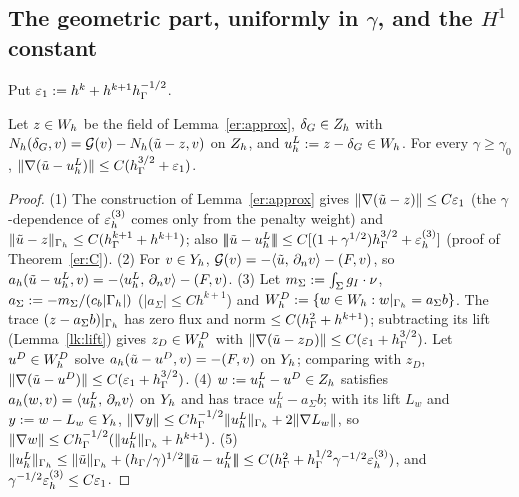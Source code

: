 \subsection{The geometric part, uniformly in \texorpdfstring{$\gamma$}{gamma}, and the \texorpdfstring{$H^1$}{H1} constant}
Put $\varepsilon_1:=h^k+h^{k+1}h_\Gamma^{-1/2}$.
\begin{lemma}\label{lk:lin}
Let $z\in W_h$ be the field of Lemma~\ref{er:approx}, $\delta_G\in Z_h$ with $N_h(\delta_G,v)=\mathcal G(v)-N_h(\tilde u-z,v)$ on $Z_h$, and $u^L_h:=z-\delta_G\in W_h$. For every $\gamma\ge\gamma_0$, $\lVert \nabla(\tilde u-u^L_h)\rVert\le C(h_\Gamma^{3/2}+\varepsilon_1)$.
\end{lemma}
\begin{proof}
(1) The construction of Lemma~\ref{er:approx} gives $\lVert \nabla(\tilde u-z)\rVert\le C\varepsilon_1$ (the $\gamma$-dependence of $\varepsilon_h^{(3)}$ comes only from the penalty weight) and $\lVert \tilde u-z\rVert_{\Gamma_h}\le C(h_\Gamma^{k+1}+h^{k+1})$; also $|\!|\!|\tilde u-u^L_h|\!|\!|\le C[(1+\gamma^{1/2})h_\Gamma^{3/2}+\varepsilon_h^{(3)}]$ (proof of Theorem~\ref{er:C}).
(2) For $v\in Y_h$, $\mathcal G(v)=-\langle \tilde u,\, \partial_n v\rangle-(F,v)$, so $a_h(\tilde u-u^L_h,v)=-\langle u^L_h,\, \partial_n v\rangle-(F,v)$.
(3) Let $m_\Sigma:=\int_\Sigma g_I\cdot\nu$, $a_\Sigma:=-m_\Sigma/(c_b|\Gamma_h|)$ ($|a_\Sigma|\le Ch^{k+1}$) and $W_h^D:=\{w\in W_h:w|_{\Gamma_h}=a_\Sigma b\}$. The trace $(z-a_\Sigma b)|_{\Gamma_h}$ has zero flux and norm $\le C(h_\Gamma^2+h^{k+1})$; subtracting its lift (Lemma~\ref{lk:lift}) gives $z_D\in W_h^D$ with $\lVert \nabla(\tilde u-z_D)\rVert\le C(\varepsilon_1+h_\Gamma^{3/2})$. Let $u^D\in W_h^D$ solve $a_h(\tilde u-u^D,v)=-(F,v)$ on $Y_h$; comparing with $z_D$, $\lVert \nabla(\tilde u-u^D)\rVert\le C(\varepsilon_1+h_\Gamma^{3/2})$.
(4) $w:=u^L_h-u^D\in Z_h$ satisfies $a_h(w,v)=\langle u^L_h,\, \partial_n v\rangle$ on $Y_h$ and has trace $u^L_h-a_\Sigma b$; with its lift $L_w$ and $y:=w-L_w\in Y_h$, $\lVert \nabla y\rVert\le Ch_\Gamma^{-1/2}\lVert u^L_h\rVert_{\Gamma_h}+2\lVert \nabla L_w\rVert$, so $\lVert \nabla w\rVert\le Ch_\Gamma^{-1/2}(\lVert u^L_h\rVert_{\Gamma_h}+h^{k+1})$.
(5) $\lVert u^L_h\rVert_{\Gamma_h}\le\lVert \tilde u\rVert_{\Gamma_h}+(h_\Gamma/\gamma)^{1/2}|\!|\!|\tilde u-u^L_h|\!|\!|\le C(h_\Gamma^2+h_\Gamma^{1/2}\gamma^{-1/2}\varepsilon_h^{(3)})$, and $\gamma^{-1/2}\varepsilon_h^{(3)}\le C\varepsilon_1$.
\end{proof}

